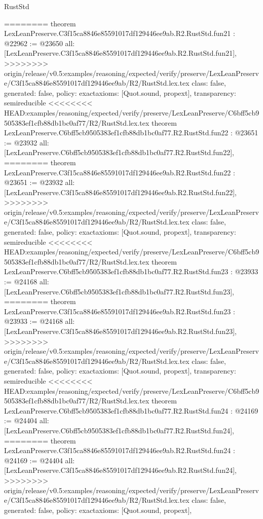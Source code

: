 \begin{lexlean}{RustStd}
\begin{coremodule}
{\begin{coremodule}
{{{{{{{{{{{{{{{{{{{{{{{{========
theorem LexLeanPreserve.C3f15ca8846e85591017df129446ee9ab.R2.RustStd.fun21 : @22962 := @23650 {
  all: [LexLeanPreserve.C3f15ca8846e85591017df129446ee9ab.R2.RustStd.fun21],
>>>>>>>> origin/release/v0.5:examples/reasoning/expected/verify/preserve/LexLeanPreserve/C3f15ca8846e85591017df129446ee9ab/R2/RustStd.lex.tex
  class: false,
  generated: false,
  policy: exact{axioms: [Quot.sound, propext]},
  transparency: semireducible
}
<<<<<<<< HEAD:examples/reasoning/expected/verify/preserve/LexLeanPreserve/C6bff5cb9505383ef1cfb88db1bc0af77/R2/RustStd.lex.tex
theorem LexLeanPreserve.C6bff5cb9505383ef1cfb88db1bc0af77.R2.RustStd.fun22 : @23651 := @23932 {
  all: [LexLeanPreserve.C6bff5cb9505383ef1cfb88db1bc0af77.R2.RustStd.fun22],
========
theorem LexLeanPreserve.C3f15ca8846e85591017df129446ee9ab.R2.RustStd.fun22 : @23651 := @23932 {
  all: [LexLeanPreserve.C3f15ca8846e85591017df129446ee9ab.R2.RustStd.fun22],
>>>>>>>> origin/release/v0.5:examples/reasoning/expected/verify/preserve/LexLeanPreserve/C3f15ca8846e85591017df129446ee9ab/R2/RustStd.lex.tex
  class: false,
  generated: false,
  policy: exact{axioms: [Quot.sound, propext]},
  transparency: semireducible
}
<<<<<<<< HEAD:examples/reasoning/expected/verify/preserve/LexLeanPreserve/C6bff5cb9505383ef1cfb88db1bc0af77/R2/RustStd.lex.tex
theorem LexLeanPreserve.C6bff5cb9505383ef1cfb88db1bc0af77.R2.RustStd.fun23 : @23933 := @24168 {
  all: [LexLeanPreserve.C6bff5cb9505383ef1cfb88db1bc0af77.R2.RustStd.fun23],
========
theorem LexLeanPreserve.C3f15ca8846e85591017df129446ee9ab.R2.RustStd.fun23 : @23933 := @24168 {
  all: [LexLeanPreserve.C3f15ca8846e85591017df129446ee9ab.R2.RustStd.fun23],
>>>>>>>> origin/release/v0.5:examples/reasoning/expected/verify/preserve/LexLeanPreserve/C3f15ca8846e85591017df129446ee9ab/R2/RustStd.lex.tex
  class: false,
  generated: false,
  policy: exact{axioms: [Quot.sound, propext]},
  transparency: semireducible
}
<<<<<<<< HEAD:examples/reasoning/expected/verify/preserve/LexLeanPreserve/C6bff5cb9505383ef1cfb88db1bc0af77/R2/RustStd.lex.tex
theorem LexLeanPreserve.C6bff5cb9505383ef1cfb88db1bc0af77.R2.RustStd.fun24 : @24169 := @24404 {
  all: [LexLeanPreserve.C6bff5cb9505383ef1cfb88db1bc0af77.R2.RustStd.fun24],
========
theorem LexLeanPreserve.C3f15ca8846e85591017df129446ee9ab.R2.RustStd.fun24 : @24169 := @24404 {
  all: [LexLeanPreserve.C3f15ca8846e85591017df129446ee9ab.R2.RustStd.fun24],
>>>>>>>> origin/release/v0.5:examples/reasoning/expected/verify/preserve/LexLeanPreserve/C3f15ca8846e85591017df129446ee9ab/R2/RustStd.lex.tex
  class: false,
  generated: false,
  policy: exact{axioms: [Quot.sound, propext]},
}}}}}}}}}}}}}}}}}}}}}}}}}}}}
\end{coremodule}}
\end{coremodule}
\end{lexlean}

